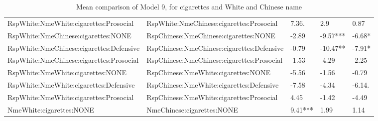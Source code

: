 \documentclass[]{report}
\begin{document}
\begin{table}[ht]
\begin{tabular}{lllll}
		RspWhite:NmeWhite:cigarettes:Prosocial  &  RspWhite:NmeChinese:cigarettes:Prosocial & 7.36. & 2.9 & 0.87 \\ 
		RspWhite:NmeChinese:cigarettes:NONE  &  RspChinese:NmeChinese:cigarettes:NONE & -2.89 & -9.57*** & -6.68* \\ 
		RspWhite:NmeChinese:cigarettes:Defensive  &  RspChinese:NmeChinese:cigarettes:Defensive & -0.79 & -10.47** & -7.91* \\ 
		RspWhite:NmeChinese:cigarettes:Prosocial  &  RspChinese:NmeChinese:cigarettes:Prosocial & -1.53 & -4.29 & -2.25 \\ 
		RspWhite:NmeWhite:cigarettes:NONE  &  RspChinese:NmeWhite:cigarettes:NONE & -5.56 & -1.56 & -0.79 \\ 
		RspWhite:NmeWhite:cigarettes:Defensive  &  RspChinese:NmeWhite:cigarettes:Defensive & -7.58 & -4.34 & -6.14. \\ 
		RspWhite:NmeWhite:cigarettes:Prosocial  &  RspChinese:NmeWhite:cigarettes:Prosocial & 4.45 & -1.42 & -4.49 \\ 
		NmeWhite:cigarettes:NONE  &  NmeChinese:cigarettes:NONE & 9.41*** & 1.99 & 1.14 \\ 
		\hline
	\end{tabular}
	\caption{Mean comparison of Model 9, for  cigarettes  and White and Chinese name} 
\end{table}
\end{document}
